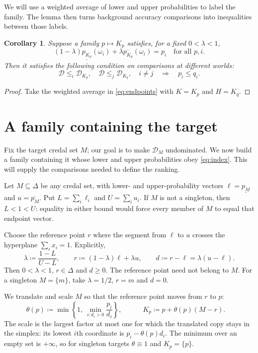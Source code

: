 \documentclass[11pt]{article}
\newtheorem{corollary}[theorem]{Corollary}
\theoremstyle{remark}
\newcommand{\Dscr}{\mathcal D}
\newcommand{\lowprob}[1]{\underline{p_{#1}}}
\newcommand{\upprob}[1]{\overline{p_{#1}}}
\begin{document}
We will use a weighted average of lower and upper probabilities to label the
family. The lemma then turns background accuracy comparisons into inequalities
between those labels.

\begin{corollary}\label{cor:cc}
Suppose a family $p\mapsto K_p$ satisfies, for a fixed $0<\lambda<1$,
\begin{equation}
 (1-\lambda)\lowprob{K_p}(\omega_i)+\lambda\upprob{K_p}(\omega_i)=p_i\quad\text{for all }p,i.\label{eq:index}
\end{equation}
Then it satisfies the following condition on comparisons at different worlds:
\begin{equation*}
 \Dscr\le_i\Dscr_{K_p},\quad \Dscr\le_j\Dscr_{K_q},\quad i\ne j
 \quad\Longrightarrow\quad p_i\le q_i.
 \tag{CC}\label{eq:cc}
\end{equation*}
\end{corollary}
\begin{proof}
Take the weighted average in \eqref{eq:endpoints} with $K=K_p$ and $H=K_q$.
\end{proof}

\section{A family containing the target}

Fix the target credal set $M$; our goal is to make $\Dscr_M$ undominated.
We now build a family containing it whose lower and upper probabilities obey
\eqref{eq:index}. This will supply the comparisons needed to define the ranking.

Let $M\subseteq\Delta$ be any credal set, with lower- and upper-probability vectors $\ell=\lowprob{M}$
and $u=\upprob{M}$. Put $L=\sum_i\ell_i$ and $U=\sum_i u_i$. If $M$ is not a
singleton, then $L<1<U$: equality in either bound would force every member
of $M$ to equal that endpoint vector.

Choose the reference point $r$ where the segment from $\ell$ to $u$ crosses the
hyperplane $\sum_i x_i=1$. Explicitly,
\begin{equation}
 \lambda\coloneqq\frac{1-L}{U-L},\qquad
 r\coloneqq(1-\lambda)\ell+\lambda u,\qquad
 d\coloneqq r-\ell=\lambda(u-\ell).\label{eq:anchor}
\end{equation}
Then $0<\lambda<1$, $r\in\Delta$ and $d\ge0$. The reference point need not belong to
$M$. For a singleton $M=\{m\}$, take $\lambda=1/2$, $r=m$ and $d=0$.

We translate and scale $M$ so that the reference point moves from $r$ to $p$:
\begin{equation}
 \theta(p)\coloneqq\min\left\{1,\ \min_{i:d_i>0}\frac{p_i}{d_i}\right\},
 \qquad
 \boxed{\quad K_p\coloneqq p+\theta(p)(M-r).\quad}\label{eq:family}
\end{equation}
The scale is the largest factor at most one for which the translated copy
stays in the simplex: its lowest $i$th coordinate is $p_i-\theta(p)d_i$.
The minimum over an empty set is $+\infty$, so for singleton targets
$\theta\equiv1$ and $K_p=\{p\}$.
\end{document}

